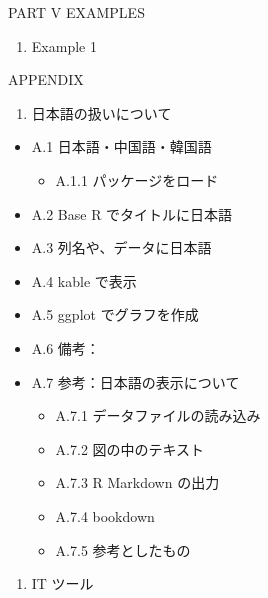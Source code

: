 \documentclass[
  xelatex, ja=standard]{bxjsbook}
\providecommand{\tightlist}{%
  \setlength{\itemsep}{0pt}\setlength{\parskip}{0pt}}
\theoremstyle{definition}
\theoremstyle{definition}
\theoremstyle{definition}
\theoremstyle{definition}
\theoremstyle{remark}
\begin{document}
PART V EXAMPLES

\begin{enumerate}
\def\labelenumi{\arabic{enumi}.}
\setcounter{enumi}{50}
\tightlist
\item
  Example 1
\end{enumerate}

APPENDIX

\begin{enumerate}
\def\labelenumi{\arabic{enumi}.}
\setcounter{enumi}{80}
\tightlist
\item
  日本語の扱いについて
\end{enumerate}

\begin{itemize}
\tightlist
\item
  A.1 日本語・中国語・韓国語

  \begin{itemize}
  \tightlist
  \item
    A.1.1 パッケージをロード
  \end{itemize}
\item
  A.2 Base R でタイトルに日本語
\item
  A.3 列名や、データに日本語
\item
  A.4 kable で表示
\item
  A.5 ggplot でグラフを作成
\item
  A.6 備考：
\item
  A.7 参考：日本語の表示について

  \begin{itemize}
  \tightlist
  \item
    A.7.1 データファイルの読み込み
  \item
    A.7.2 図の中のテキスト
  \item
    A.7.3 R Markdown の出力
  \item
    A.7.4 bookdown
  \item
    A.7.5 参考としたもの
  \end{itemize}
\end{itemize}

\begin{enumerate}
\def\labelenumi{\arabic{enumi}.}
\setcounter{enumi}{84}
\tightlist
\item
  IT ツール
\end{enumerate}
\end{document}
